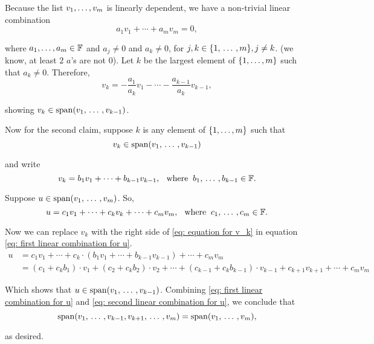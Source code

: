 \begin{prf}
  Because the list $v_1, \dots, v_m$ is linearly dependent, we have a non-trivial linear combination
  \begin{equation}
    a_1 v_1 + \cdots + a_m v_m = 0,
  \end{equation}

  where $a_1, \ldots, a_m \in \mathbb{F}$ and $a_j \neq 0$ and $a_k \neq 0 $, for $j,k \in \{1, {\, \ldots \,\,}, m\}, j \neq k$.
  (we know, at least $2$ $a$'s are not $0$). Let $k$ be the largest element of $\{ 1, \ldots, m \}$ such that $a_k \neq 0$. Therefore,
  \begin{equation}
    v_k = - \frac{a_1}{a_k}v_1 - \cdots - \frac{a_{k-1}}{a_k}v_{k-1},
  \end{equation}

  showing $v_k \in \operatorname{span} (v_1, {\, \ldots \,\,}, v_{k-1})$.

  Now for the second claim, suppose $k$ is any element of $\{ 1, \ldots, m \}$ such that
  \begin{equation}
    v_k \in \operatorname{span} (v_1, {\, \ldots \,\,}, v_{k-1})
  \end{equation}

  and write
  \begin{equation}
    \label{eq: equation for v_k}
    v_k = b_1v_1 + \cdots + b_{k-1}v_{k-1}, \;\;\, \text{where}\;\; b_1, {\, \ldots \,\,}, b_{k-1} \in \mathbb{F}.
  \end{equation}

  Suppose $u \in \operatorname{span} (v_1, {\, \ldots \,\,}, v_m)$. So,
  \begin{equation}
    \label{eq: first linear combination for u}
    u = c_1v_1 + \cdots + c_kv_k + \cdots +c_{m}v_{m}, \;\;\, \text{where}\;\; c_1, {\, \ldots \,\,}, c_{m} \in \mathbb{F}.
  \end{equation}

  Now we can replace $v_k$ with the right side of \eqref{eq: equation for v_k} in equation \eqref{eq: first linear combination for u}.
  \begin{equation}
    \begin{aligned}
      \label{eq: second linear combination for u}
      u
      & = c_1v_1 + \cdots + c_k \cdot (b_1v_1 + \cdots + b_{k-1}v_{k-1}) + \cdots +c_{m}v_{m} \\
      & = (c_1 + c_k b_1)\cdot v_1 + (c_2 + c_k b_2) \cdot v_2 + \cdots + (c_{k-1}+c_k b_{k-1}) \cdot v_{k-1} + c_{k+1} v_{k+1} + \cdots + c_m v_m
    \end{aligned}
  \end{equation}

  Which shows that $u \in \operatorname{span} (v_1, {\, \ldots \,\,}, v_{k-1})$. Combining \eqref{eq: first linear combination for u} and \eqref{eq: second linear combination for u}, we conclude that
  \begin{equation}
    \operatorname{span} (v_1, {\, \ldots \,\,}, v_{k-1}, v_{k+1}, {\, \ldots \,\,}, v_m) = \operatorname{span} (v_1, {\, \ldots \,\,}, v_m),
  \end{equation}

  as desired.
\end{prf}

